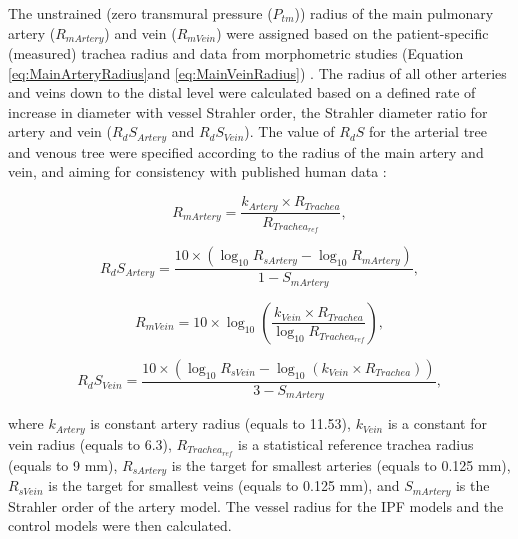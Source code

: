 The unstrained (zero transmural pressure ($P_{tm}$)) radius of the main pulmonary artery ($R_{mArtery}$) and vein ($R_{mVein}$) were assigned based on the patient-specific (measured) trachea radius and data from morphometric studies (Equation \ref{eq:MainArteryRadius}and \ref{eq:MainVeinRadius}) \citep{horsfield1978morphometry,horsfield1981morphometry,huang1996morphometry}. The radius of all other arteries and veins down to the distal level were calculated based on a defined rate of increase in diameter with vessel Strahler order, the Strahler diameter ratio for artery and vein ($R_dS_{Artery}$ and $R_dS_{Vein}$). The value of $R_dS$ for the arterial tree and venous tree were specified according to the radius of the main artery and vein, and aiming for consistency with published human data \citep{horsfield1971models, horsfield1978morphometry,horsfield1981morphometry,huang1996morphometry}:

\begin{equation} 
 \label{eq:MainArteryRadius}
 R_{mArtery} = \frac{k_{Artery} \times R_{Trachea}}{{R_{Trachea_{ref}}}},
\end{equation}

\begin{equation} 
 \label{eq:ArteryStrahlerDiameterRatio}
 R_dS_{Artery} = \frac{10 \times (\log_{10}R_{sArtery} - \log_{10}R_{mArtery})}{1-S_{mArtery}},
\end{equation}

\begin{equation} 
 \label{eq:MainVeinRadius}
 R_{mVein} = 10 \times \log_{10}(\frac{k_{Vein} \times R_{Trachea}}{\log_{10}R_{Trachea_{ref}}}),
\end{equation}

\begin{equation} 
 \label{eq:VeinStrahlerDiameterRatio}
 R_dS_{Vein} = \frac{10 \times (\log_{10}R_{sVein} - \log_{10}(k_{Vein} \times R_{Trachea}))}{3 - S_{mArtery}},
\end{equation}

\noindent where $k_{Artery}$ is constant artery radius (equals to 11.53), $k_{Vein}$ is a constant for vein radius (equals to 6.3), $R_{Trachea_{ref}}$ is a statistical reference trachea radius (equals to 9 mm), $R_{sArtery}$ is the target for smallest arteries (equals to 0.125 mm), $R_{sVein}$ is the target for smallest veins (equals to 0.125 mm), and $S_{mArtery}$ is the Strahler order of the artery model. The vessel radius for the IPF models and the control models were then calculated. 
 

